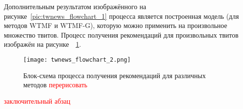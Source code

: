     Дополнительным результатом изображённого на рисунке~\ref{pic:twnews_flowchart_1} процесса является построенная модель (для методов WTMF и WTMF-G), которую можно применить на произвольное множество твитов. Процесс получения рекомендаций для произвольных твитов изображён на рисунке~~\ref{pic:twnews_flowchart_2}.
    
    \begin{figure}[h!]
            \center
            \texttt{[image: twnews\_flowchart\_2.png]}
            \caption{Блок-схема процесса получения рекомендаций для различных методов \textcolor{red}{перерисовать}}
            \label{pic:twnews_flowchart_2}
    \end{figure}

    \textcolor{red}{заключительный абзац}

    \clearpage



